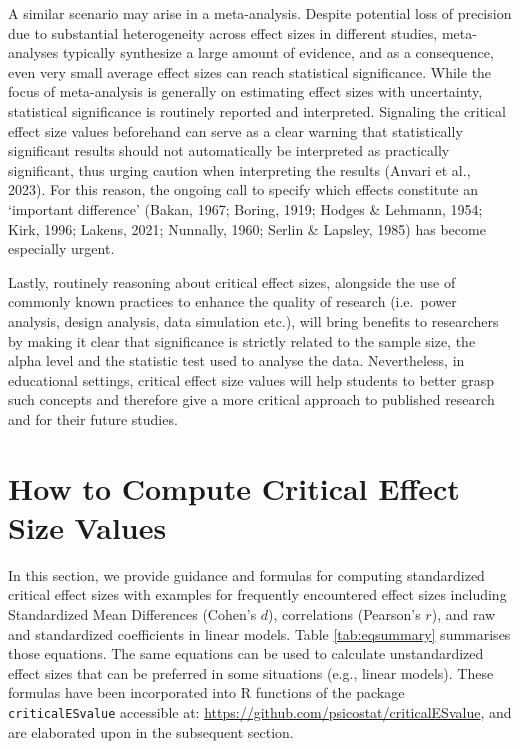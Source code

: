 \documentclass[
  man,floatsintext]{apa7}
\begin{document}
A similar scenario may arise in a meta-analysis. Despite potential loss of precision due to substantial heterogeneity across effect sizes in different studies, meta-analyses typically synthesize a large amount of evidence, and as a consequence, even very small average effect sizes can reach statistical significance. While the focus of meta-analysis is generally on estimating effect sizes with uncertainty, statistical significance is routinely reported and interpreted. Signaling the critical effect size values beforehand can serve as a clear warning that statistically significant results should not automatically be interpreted as practically significant, thus urging caution when interpreting the results (Anvari et al., 2023). For this reason, the ongoing call to specify which effects constitute an `important difference' (Bakan, 1967; Boring, 1919; Hodges \& Lehmann, 1954; Kirk, 1996; Lakens, 2021; Nunnally, 1960; Serlin \& Lapsley, 1985) has become especially urgent.

Lastly, routinely reasoning about critical effect sizes, alongside the use of commonly known practices to enhance the quality of research (i.e.~power analysis, design analysis, data simulation etc.), will bring benefits to researchers by making it clear that significance is strictly related to the sample size, the alpha level and the statistic test used to analyse the data. Nevertheless, in educational settings, critical effect size values will help students to better grasp such concepts and therefore give a more critical approach to published research and for their future studies.

\section{How to Compute Critical Effect Size Values}\label{how-to-compute-critical-effect-size-values}

In this section, we provide guidance and formulas for computing standardized critical effect sizes with examples for frequently encountered effect sizes including Standardized Mean Differences (Cohen's \(d\)), correlations (Pearson's \(r\)), and raw and standardized coefficients in linear models. Table \ref{tab:eqsummary} summarises those equations. The same equations can be used to calculate unstandardized effect sizes that can be preferred in some situations (e.g., linear models). These formulas have been incorporated into R functions of the package \texttt{criticalESvalue} accessible at: \url{https://github.com/psicostat/criticalESvalue}, and are elaborated upon in the subsequent section.
\end{document}
